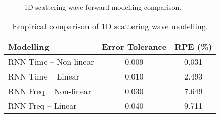 \begin{figure}[!ht]
	\centering
	\caption[1D scattering wave forward modelling comparison.]{1D scattering wave forward modelling comparison.}    
	\label{fig:app_rnn_1d_scattering}
\end{figure}

\begin{table*}[!ht]
        \footnotesize
        \centering
        \begin{tabular}{@{}lcc@{}}\toprule
Modelling  & Error Tolerance    & RPE (\%) \\ \hline
RNN Time – Non-linear	& 0.009	& 0.031     \\
RNN Time – Linear 	& 0.010	& 2.493         \\
RNN Freq – Non-linear	& 0.030	& 7.649         \\
RNN Freq – Linear	& 0.040 & 9.711          \\ \hline
        \end{tabular}
        \caption{Empirical comparison of 1D scattering wave modelling.}\label{tab:app_rnn_1d_scattering}
\end{table*}


